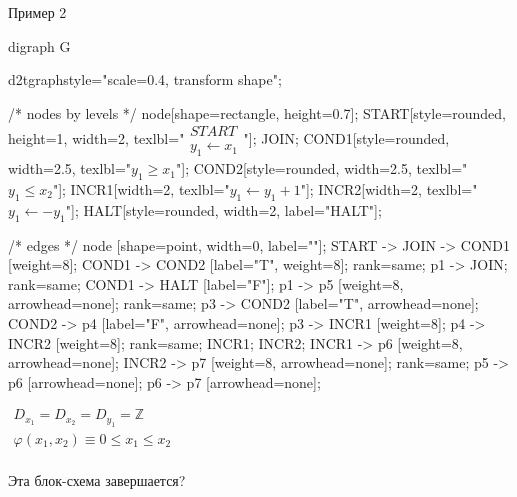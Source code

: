 \documentclass[hyperref={unicode=true}]{beamer}
\begin{document}
    \begin{frame}[fragile]{Пример 2}
    \begin{multicols}{2}
	\huge
	\begin{dot2tex}[options=-traw]
	digraph G{
		d2tgraphstyle="scale=0.4, transform shape";

		/* nodes by levels */
		node[shape=rectangle, height=0.7];
		START[style=rounded, height=1, width=2, texlbl="$\begin{matrix}START\\ y_1 \leftarrow x_1\end{matrix}$"];
		JOIN;
        COND1[style=rounded, width=2.5, texlbl="$y_1 \geq x_1$"];
        COND2[style=rounded, width=2.5, texlbl="$y_1 \leq x_2$"];
		INCR1[width=2, texlbl="$y_1 \leftarrow y_1 + 1$"];
		INCR2[width=2, texlbl="$y_1 \leftarrow -y_1$"];
        HALT[style=rounded, width=2, label="HALT"];

		/* edges */
		node [shape=point, width=0, label=""];
		START -> JOIN -> COND1 [weight=8];
        COND1 -> COND2 [label="T", weight=8];
		{ rank=same; p1 -> JOIN; }
        { rank=same; COND1 -> HALT [label="F"]; }
		p1 -> p5 [weight=8, arrowhead=none];
		{ rank=same; p3 -> COND2 [label="T", arrowhead=none]; COND2 -> p4 [label="F", arrowhead=none]; }
		p3 -> INCR1 [weight=8];
		p4 -> INCR2 [weight=8];
		{ rank=same; INCR1; INCR2; }
		INCR1 -> p6 [weight=8, arrowhead=none];
		INCR2 -> p7 [weight=8, arrowhead=none];
		{ rank=same; p5 -> p6 [arrowhead=none]; p6 -> p7 [arrowhead=none]; }
        }
	\end{dot2tex}

	\normalsize

    $\begin{matrix}
    D_{x_1} = D_{x_2} = D_{y_1} = \mathbb{Z}\\
    \varphi(x_1, x_2) \equiv 0 \leq x_1 \leq x_2\\
    \end{matrix}$

    Эта блок-схема завершается?
    \end{multicols}
    \end{frame}
\end{document}
